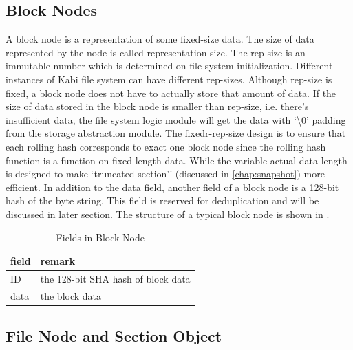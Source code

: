 \subsection{Block Nodes}

    A block node is a representation of some fixed-size data. The size of data represented by the node is called representation size. The rep-size is an immutable number which is determined on file system initialization. Different instances of Kabi file system can have different rep-sizes. Although rep-size is fixed, a block node does not have to actually store that amount of data. If the size of data stored in the block node is smaller than rep-size, i.e. there's insufficient data, the file system logic module will get the data with `\textbackslash0' padding from the storage abstraction module. The fixedr-rep-size design is to ensure that each rolling hash corresponds to exact one block node since the rolling hash function is a function on fixed length data. While the variable actual-data-length is designed to make `truncated section'' (discussed in \cref{chap:snapshot}) more efficient. In addition to the data field, another field of a block node is a 128-bit hash of the byte string. This field is reserved for deduplication and will be discussed in later section. The structure of a typical block node is shown in .

\begin{table}[t]
\begin{center}
\caption{Fields in Block Node}
\begin{tabular}{ll}
\toprule
field & remark\\
\midrule
ID & the 128-bit SHA hash of block data\\
data & the block data\\
\bottomrule
\end{tabular}
\end{center}
\label{tab:block_fields}
\end{table}

\subsection{File Node and Section Object}

